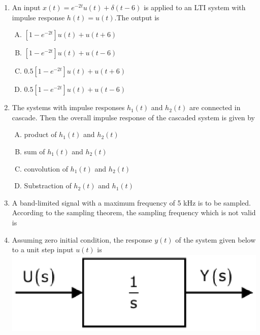 \documentclass[journal,12pt,twocolumn]{IEEEtran}
\begin{document}
\begin{enumerate}[1.]
\item An input $x(t)=e^{-2t}u(t)+\delta(t-6)$ is applied to an LTI system with impulse response $h(t)=u(t)$.The output is
\begin{enumerate}[(A)]
\setlength\itemsep{1em}

\item $[1-e^{-2t}]u(t)+u(t+6)$
\item $[1-e^{-2t}]u(t)+u(t-6)$
\item $0.5[1-e^{-2t}]u(t)+u(t+6)$
\item $0.5[1-e^{-2t}]u(t)+u(t-6)$
\end{enumerate}



\item The systems with impulse responses $h_1(t)$ and $h_2(t)$ are connected in cascade. Then the overall impulse response of the cascaded system is given by
\begin{enumerate}[(A)]
\setlength\itemsep{1em}

\item product of $h_1(t)$ and $h_2(t)$
\item sum of $h_1(t)$ and $h_2(t)$
\item convolution of $h_1(t)$ and $h_2(t)$
\item Substraction of $h_2(t)$ and $h_1(t)$
\end{enumerate}


\item A band-limited signal with a maximum frequency of 5 kHz is to be sampled. According to the sampling theorem, the sampling frequency which is not valid is
\begin{enumerate}[(A)]

\end{enumerate}

\item Assuming zero initial condition, the response $y(t)$ of the system given below to a unit step input $u(t)$ is\\
\includegraphics[scale=0.4]{fig12.eps}
\begin{enumerate}[(A)]


\end{enumerate}
\end{enumerate}
\end{document}
